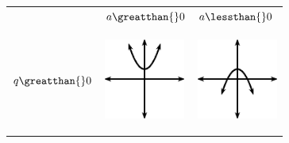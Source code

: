 \begin{center}
\label{m39345*uid116}
\noindent
{}
\tablelasttail{}
\begin{xtabular*}{\mytablewidth}[t]{|p{10\mystarwidth}|p{10\mystarwidth}|p{10\mystarwidth}|}\hline
&
    $a\greatthan{}0$
    &
    $a\lessthan{}0$
\tabularnewline{}
    $q\greatthan{}0$
    &
\setcounter{subfigure}{0}
\label{m39345*id241967}
\begin{center}
\label{m39345*id241967!!!underscore!!!media}\label{m39345*id241967!!!underscore!!!printimage}\includegraphics[width=100px]{col11306.imgs/m39345_MG10C11_015.png} %
\vspace{2pt}
\vspace{.1in}
\end{center}    
    &
\setcounter{subfigure}{0}
\label{m39345*id241979}
\begin{center}
\label{m39345*id241979!!!underscore!!!media}\label{m39345*id241979!!!underscore!!!printimage}\includegraphics[width=100px]{col11306.imgs/m39345_MG10C11_016.png} %

\end{center}
\end{xtabular*}
\end{center}

